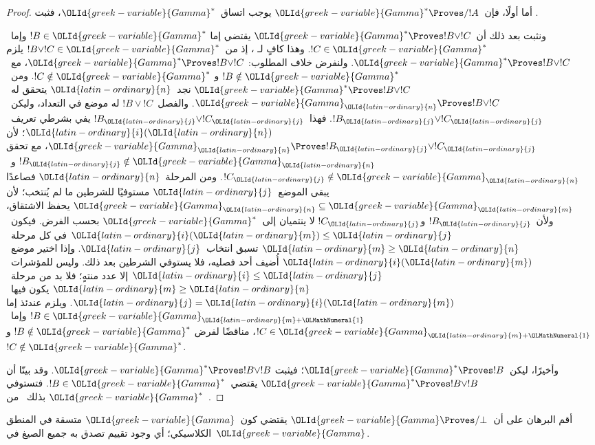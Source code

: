 \documentclass[../../../include/open-logic-section]{subfiles}
\begin{document}
\begin{proof}
  أما أولًا، فإن~${\OLId{greek-variable}{Gamma}}^*\Proves/!A$ يوجب اتساق~${\OLId{greek-variable}{Gamma}}^*$، فثبت
  .

  ونثبت بعد ذلك أن~${\OLId{greek-variable}{Gamma}}^*\Proves !B\lor !C$ يقتضي إما
  $!B\in{\OLId{greek-variable}{Gamma}}^*$ وإما~$!C\in{\OLId{greek-variable}{Gamma}}^*$. وهذا كافٍ لـ
  ، إذ من~$!B\lor !C\in{\OLId{greek-variable}{Gamma}}^*$ يلزم
  ${\OLId{greek-variable}{Gamma}}^*\Proves !B\lor !C$. ولنفرض خلاف المطلوب:
  ${\OLId{greek-variable}{Gamma}}^*\Proves !B\lor !C$، مع~$!B\notin{\OLId{greek-variable}{Gamma}}^*$ و
  $!C\notin{\OLId{greek-variable}{Gamma}}^*$. ومن~${\OLId{greek-variable}{Gamma}}^*\Proves !B\lor !C$ نجد~${\OLId{latin-ordinary}{n}}$
  يتحقق له~${\OLId{greek-variable}{Gamma}}_{\OLId{latin-ordinary}{n}}\Proves !B\lor !C$. والفصل~$!B\lor !C$ له موضع
  في التعداد، وليكن~$!B_{\OLId{latin-ordinary}{j}}\lor !C_{\OLId{latin-ordinary}{j}}$. فهذا~$!B_{\OLId{latin-ordinary}{j}}\lor !C_{\OLId{latin-ordinary}{j}}$ يفي بشرطي
  تعريف~${\OLId{latin-ordinary}{i}}({\OLId{latin-ordinary}{n}})$؛ لأن
  ${\OLId{greek-variable}{Gamma}}_{\OLId{latin-ordinary}{n}}\Proves !B_{\OLId{latin-ordinary}{j}}\lor !C_{\OLId{latin-ordinary}{j}}$، مع تحقق
  $!B_{\OLId{latin-ordinary}{j}}\notin{\OLId{greek-variable}{Gamma}}_{\OLId{latin-ordinary}{n}}$ و~$!C_{\OLId{latin-ordinary}{j}}\notin{\OLId{greek-variable}{Gamma}}_{\OLId{latin-ordinary}{n}}$. ومن المرحلة~${\OLId{latin-ordinary}{n}}$
  فصاعدًا يبقى الموضع~${\OLId{latin-ordinary}{j}}$ مستوفيًا للشرطين ما لم يُنتخب؛ لأن
  ${\OLId{greek-variable}{Gamma}}_{\OLId{latin-ordinary}{n}}\subseteq{\OLId{greek-variable}{Gamma}}_{\OLId{latin-ordinary}{m}}$ يحفظ الاشتقاق، ولأن~$!B_{\OLId{latin-ordinary}{j}}$ و$!C_{\OLId{latin-ordinary}{j}}$ لا
  ينتميان إلى~${\OLId{greek-variable}{Gamma}}^*$ بحسب الفرض. فيكون~${\OLId{latin-ordinary}{i}}({\OLId{latin-ordinary}{m}})\leq {\OLId{latin-ordinary}{j}}$ في كل
  مرحلة~${\OLId{latin-ordinary}{m}}\geq {\OLId{latin-ordinary}{n}}$ تسبق انتخاب~${\OLId{latin-ordinary}{j}}$. وإذا اختير موضع~${\OLId{latin-ordinary}{i}}({\OLId{latin-ordinary}{m}})$ أُضيف أحد فصليه، فلا
  يستوفي الشرطين بعد ذلك. وليس للمؤشرات~${\OLId{latin-ordinary}{i}}\leq {\OLId{latin-ordinary}{j}}$ إلا عدد منتهٍ؛ فلا بد
  من مرحلة~${\OLId{latin-ordinary}{m}}\geq {\OLId{latin-ordinary}{n}}$ يكون فيها~${\OLId{latin-ordinary}{j}}={\OLId{latin-ordinary}{i}}({\OLId{latin-ordinary}{m}})$. ويلزم عندئذ إما
  $!B\in{\OLId{greek-variable}{Gamma}}_{{\OLId{latin-ordinary}{m}}+{\OLMathNumeral{1}}}$ وإما~$!C\in{\OLId{greek-variable}{Gamma}}_{{\OLId{latin-ordinary}{m}}+{\OLMathNumeral{1}}}$، مناقضًا لفرض
  $!B\notin{\OLId{greek-variable}{Gamma}}^*$ و$!C\notin{\OLId{greek-variable}{Gamma}}^*$.

  وأخيرًا، ليكن~${\OLId{greek-variable}{Gamma}}^*\Proves !B$؛ فيثبت
  ${\OLId{greek-variable}{Gamma}}^*\Proves !B\lor !B$. وقد بينّا أن
  ${\OLId{greek-variable}{Gamma}}^*\Proves !B\lor !B$ يقتضي~$!B\in{\OLId{greek-variable}{Gamma}}^*$. فتستوفي
  ${\OLId{greek-variable}{Gamma}}^*$ بذلك~ من~.
\end{proof}

\begin{prob}
أقم البرهان على أن~${\OLId{greek-variable}{Gamma}} \Proves/ \bot$ يقتضي كون~${\OLId{greek-variable}{Gamma}}$ متسقة في
المنطق الكلاسيكي؛ أي وجود تقييم تصدق به جميع الصيغ في~${\OLId{greek-variable}{Gamma}}$.
\end{prob}
\end{document}
